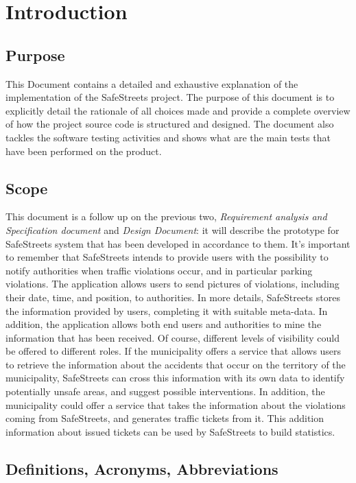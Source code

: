 \documentclass[../ITD.tex]{subfiles}
\begin{document}
    \chapter{Introduction}\label{ch:introduction}
    \section{Purpose}\label{sec:purpose}
    This Document contains a detailed and exhaustive explanation of the implementation of the SafeStreets project.
    The purpose of this document is to explicitly detail the rationale of all choices made and provide a complete overview of how the project source code is structured and designed.
    The document also tackles the software testing activities and shows what are the main tests that have been performed on the product.
    \section{Scope}\label{sec:scope}
    This  document  is  a  follow  up  on  the  previous  two,  \textit{Requirement  analysis  and  Specification document} and \textit{Design Document}:  it will describe the prototype for SafeStreets system that has been developed in accordance to them.
    It's important to remember that SafeStreets intends to provide users with the possibility to notify authorities when traffic violations occur, and in particular parking violations.
    The application allows users to send pictures of violations, including their date, time, and position, to authorities.
    In more details, SafeStreets stores the information provided by users, completing it with suitable meta-data.
    In addition, the application allows both end users and authorities to mine the information that has been received.
    Of course, different levels of visibility could be offered to different roles.
    If the municipality offers a service that allows users to retrieve the information about the accidents that occur on the territory of the municipality,
    SafeStreets can cross this information with its own data to identify potentially unsafe areas, and suggest possible interventions.
    In addition, the municipality could offer a service that takes the information about the violations coming from SafeStreets, and generates traffic tickets from it.
    This addition information about issued tickets can be used by SafeStreets to build statistics.
    \newpage
    \section{Definitions, Acronyms, Abbreviations}\label{sec:definitions,-acronyms,-abbreviations}
\end{document}
